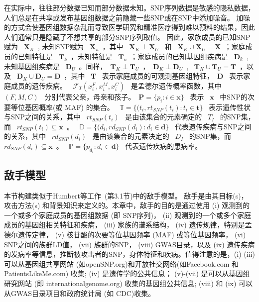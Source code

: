 在实际中，往往部分数据已知而部分数据未知。SNP序列数据是敏感的隐私数据，人们总是在共享或发布基因组数据之前隐藏一些SNP或在SNP中添加噪音。 加噪的方式会使基因组数据杂乱而导致医学研究和精准医疗得到难以预料的结果，因此人们通常只是隐藏了不想共享的部分SNP序列取值。 因此，家族成员的已知SNP赋为 ~$\mathbf{X}_K$~, 未知SNP赋为 ~$\mathbf{X}_u$~，其中 ~$\mathbf{X}_K \perp\mathbf{X}_U$~ 和 ~$\mathbf{X}_K \cup \mathbf{X}_U = \mathbf{X}$~；家庭成员的已知特征是 ~$\mathbf{T}_k$~，未知特征是 ~$\mathbf{T}_u$~；家庭成员的已知基因组疾病是 ~$\mathbf{D}_k$~, 未知基因组疾病是 ~$\mathbf{D}_U$~。同样，~$\mathbf{T}_K \perp \mathbf{T}_U$~，~$\mathbf{D}_K \perp \mathbf{D}_U$~, ~$\mathbf{T}_K \cup \mathbf{T}_U = \mathbf{T}$~，以及 ~$\mathbf{D}_K \cup \mathbf{D}_U = \mathbf{D}$~，其中 ~$\mathbf{T}$~ 表示家庭成员的可观测基因组特征，~$\mathbf{D}$~ 表示家庭成员的遗传疾病。 ~$\mathcal{F}_T(x_i^F,x_i^M,x_i^C)$~ 是孟德尔遗传概率函数，其中 ~$(F,M,C)$~ 分别代表父亲，母亲和孩子。~$\mathbf{P}=\{p_i: i \in \mathbf{x}\}$~ 表示 ~$\mathbf{x}$~ 中SNP的次要等位基因概率(或 MAF) 的集合。 ~$\mathbb{T}=\{(t_i,rt_{SNP}(t_i): t_i \in \mathbf{t}\}$~ 表示遗传性状与SNP之间的关系，其中 ~$rt_{SNP}(t_i)$~ 是由该集合的元素确定的 ~$T_I$~ 的SNP集，而 ~$rt_{SNP}(t_i) \subseteq \mathbf{x}$~。 ~$\mathbb{D}=\{(d_i,rd_{SNP}(d_i): d_i \in \mathbf{d}\}$~ 代表遗传疾病与SNP之间的关系，其中 ~$rd_{SNP}(d_i)$~ 是由该集合的元素决定的 ~$D_I$~ 的SNP集，而 ~$rd_{SNP}(d_i) \subseteq \mathbf{x}$~。 ~$\mathbb{P}=\{p_{d_i}: d_i \in \mathbf{d}\}$~ 代表遗传疾病的患病率。

\subsection{敌手模型}

本节构建类似于Humbert等工作~\cite{humbert2013addressing}(第3.1节)中的敌手模型。 敌手是由其目标(s)， 攻击方法(s) 和背景知识来定义的。本章中，敌手的目的是通过使用 (i) 观测到的一个或多个家庭成员的基因组数据 (即 SNP序列)，  (ii) 观测到的一个或多个家庭成员的基因组相关特征和疾病， (iii) 家族的谱系结构， (iv) 遗传规律，特别是孟德尔遗传定律， (v) 核苷酸的次要等位基因频率 (MAF) 或等位基因频率， (vi) SNP之间的族群LD值， (vii) 族群的SNP， (viii) GWAS目录，以及 (ix) 遗传疾病的发病率等信息，推断被攻击者的SNP，身体特征和疾病。值得注意的是，(i)-(iii) 可以从基因组共享网站 (如openSNP.org)和开放社交网络(如Facebook.com 和 PatientsLikeMe.com) 收集; (iv) 是遗传学的公共信息； (v)-(vii) 是可以从基因组研究网站 (即 internationalgenome.org) 收集的基因组公共信息; (viii) 和 (ix) 可以从GWAS目录项目和政府统计局 (如 CDC)收集。

